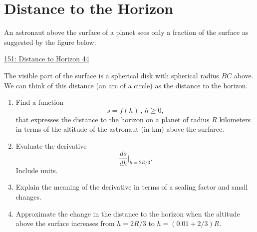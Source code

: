 \documentclass{ximera}
\begin{document}
\section{Distance to the Horizon}
\begin{example} \label{ExKdfdKREGER}
An astronaut above the surface of a planet sees only a fraction of the surface as suggested by the figure below.

\begin{onlineOnly}
    \begin{center}
\end{center}
\end{onlineOnly}

\href{https://www.desmos.com/calculator/8shf1msp4m}{151: Distance to Horizon 44}

The visible part of the surface is a spherical disk with spherical radius $BC$ above. We can think of this distance (an arc of a circle) as the distance to the horizon.

\begin{enumerate}
\item Find a function 
\[
   s = f(h) \, , \, h\geq 0,
\]
that expresses the distance to the horizon on a planet of radius $R$ kilometers in terms of the altitude of the astronaut (in km) above the surfarce.

\item Evaluate the derivative
\[
      \frac{ds}{dh} \Big|_{h=2R/3} .
\]
Include units.

\item Explain the meaning of the derivative in terms of a scaling factor and small changes.

\item Approximate the change in the distance to the horizon when the altitude above the surface increases from $h=2R/3$ to $h=(0.01 + 2/3)R$.
\end{enumerate}

\end{example}
\end{document}
